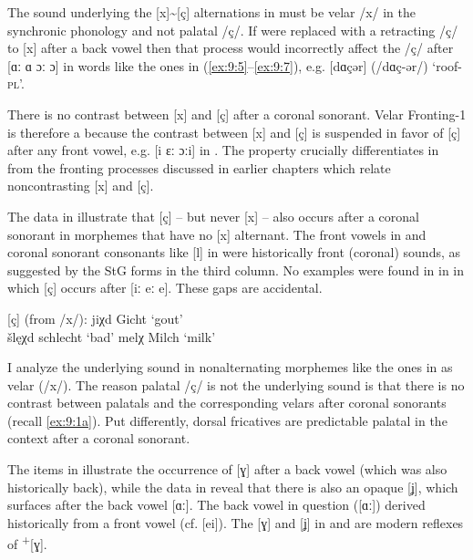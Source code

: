 The sound underlying the [x]{\textasciitilde}[ç] alternations in  must be velar /x/ in the synchronic phonology and not palatal /ç/. If  were replaced with a  retracting /ç/ to [x] after a back vowel then that process would incorrectly affect the /ç/ after [ɑː ɑ ɔː ɔ] in words like the ones in (\ref{ex:9:5}--\ref{ex:9:7}), e.g. [dɑçər] (/dɑç-ər/) ‘roof-\textsc{pl}’.

There is no contrast between [x] and [ç] after a coronal sonorant. Velar Front\-ing-1 is  therefore a  because the contrast between [x] and [ç] is suspended in favor of [ç] after any front vowel, e.g. [i ɛː ɔːi] in . The  property crucially differentiates  in  from the fronting processes discussed in earlier chapters which relate noncontrasting [x] and [ç].

The data in  illustrate that [ç] -- but never [x] -- also occurs after a coronal sonorant in morphemes that have no [x] alternant. The front vowels in  and coronal sonorant consonants like [l] in  were historically front (coronal) sounds, as suggested by the StG forms in the third column. No examples were found in in \citet{Kroh1915} in which [ç] occurs after [iː eː e]. These gaps are accidental.

\ea%
\label{ex:9:10} [ç] (from /x/):
\ea\label{ex:9:10a}   jiχd  \tab [ʝiçt]  \tab Gicht    \tab ‘gout’ \\
      šlęχd \tab [ʃlɛçt] \tab schlecht \tab ‘bad’  
\ex\label{ex:9:10b}   melχ  \tab [melç]  \tab Milch    \tab ‘milk’ 
\z 
\z 

I analyze the underlying sound in nonalternating morphemes like the ones in  as velar (/x/). The reason palatal /ç/ is not the underlying sound is that there is no contrast between palatals and the corresponding velars after coronal sonorants (recall \ref{ex:9:1a}). Put differently, dorsal fricatives are predictable palatal in the context after a coronal sonorant.

The items in  illustrate the occurrence of [ɣ] after a back vowel (which was also historically back), while the data in  reveal that there is also an opaque [ʝ], which surfaces after the back vowel [ɑː]. The back vowel in question ([ɑː]) derived historically from a front vowel (cf.  [ei]). The [ɣ] and [ʝ] in  and  are modern reflexes of  \textsuperscript{+}[ɣ].

